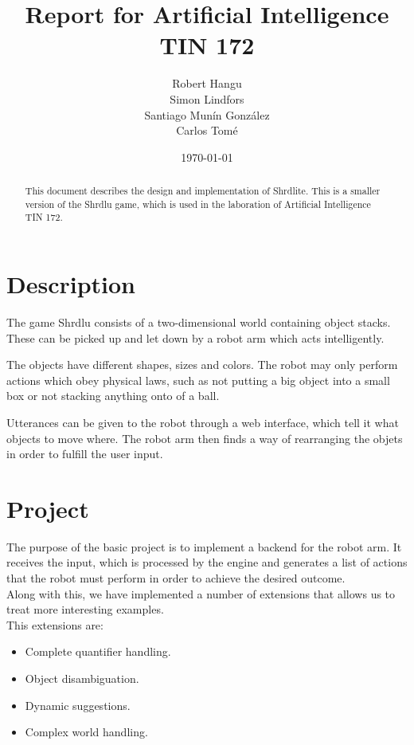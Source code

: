 \documentclass[11pt]{article}
\title{Report for Artificial Intelligence TIN 172}
\author{Robert Hangu\\\And
  Simon Lindfors\\\And
  Santiago Munín González\\\And
  Carlos Tomé
   }
\date{\today}
\begin{document}
	\maketitle
	\begin{abstract}

		This document describes the design and implementation of Shrdlite. This 
		is a smaller version of the Shrdlu game, which is used in the 
		laboration of Artificial Intelligence TIN 172.

	\end{abstract}

	\section{Description}
	
	The game Shrdlu consists of a two-dimensional world containing object 
	stacks. These can be picked up and let down by a robot arm which acts 
	intelligently. 

	The objects have different shapes, sizes and colors. The robot may only 
	perform actions which obey physical laws, such as not putting a big object 
	into a small box or not stacking anything onto of a ball.

	Utterances can be given to the robot through a web interface, which tell it 
	what objects to move where. The robot arm then finds a way of rearranging 
	the objets in order to fulfill the user input.

	\section{Project}

	The purpose of the basic project is to implement a backend for the robot 
	arm. It receives the input, which is processed by the engine and 
	generates a list of actions that the robot must perform in order to achieve 
	the desired outcome. \\
	
        Along with this, we have implemented a number of extensions that 
        allows us to treat more interesting examples.  \\

        This extensions are: \\

        \begin{itemize}
          \item Complete quantifier handling.  \\

          \item Object disambiguation. \\ 

          \item Dynamic suggestions.  \\

          \item Complex world handling.  \\

        \end{itemize}
\end{document}
